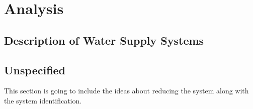 
\part{Analysis}
\label{Analysis}

\chapter{Description of Water Supply Systems}
\label{description_of_water_supply_systems}

 





\chapter{Unspecified}
\label{unspecified}

This section is going to include the ideas about reducing the system along with the system identification. 





























